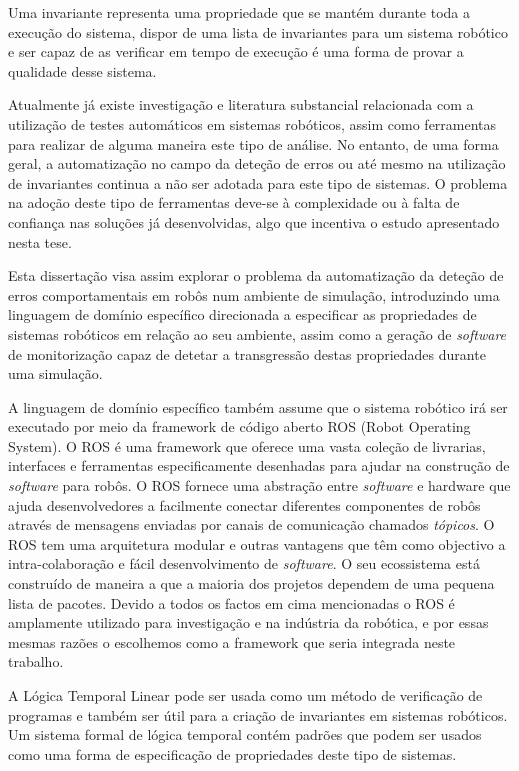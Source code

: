 Uma invariante representa uma propriedade que se mantém durante toda a execução do sistema, dispor de uma lista de invariantes para um sistema robótico e ser capaz de as verificar em tempo de execução é uma forma de provar a qualidade desse sistema.

Atualmente já existe investigação e literatura substancial relacionada com a utilização de testes automáticos em sistemas robóticos, assim como ferramentas para realizar de alguma maneira este tipo de análise. No entanto, de uma forma geral, a automatização no campo da deteção de erros ou até mesmo na utilização de invariantes continua a não ser adotada para este tipo de sistemas. O problema na adoção deste tipo de ferramentas deve-se à complexidade ou à falta de confiança nas soluções já desenvolvidas, algo que incentiva o estudo apresentado nesta tese.

Esta dissertação visa assim explorar o problema da automatização da deteção de erros comportamentais em robôs num ambiente de simulação, introduzindo uma linguagem de domínio específico direcionada a especificar as propriedades de sistemas robóticos em relação ao seu ambiente, assim como a geração de \textit{software} de monitorização capaz de detetar a transgressão destas propriedades durante uma simulação.

A linguagem de domínio específico também assume que o sistema robótico irá ser executado por meio da framework de código aberto ROS (Robot Operating System). O ROS é uma framework que oferece uma vasta coleção de livrarias, interfaces e ferramentas especificamente desenhadas para ajudar na construção de \textit{software} para robôs. O ROS fornece uma abstração entre \textit{software} e hardware que ajuda desenvolvedores a facilmente conectar diferentes componentes de robôs através de mensagens enviadas por canais de comunicação chamados \textit{tópicos}. O ROS tem uma arquitetura modular e outras vantagens que têm como objectivo a intra-colaboração e fácil desenvolvimento de \textit{software}. O seu ecossistema está construído de maneira a que a maioria dos projetos dependem de uma pequena lista de pacotes. Devido a todos os factos em cima mencionadas o ROS é amplamente utilizado para investigação e na indústria da robótica, e por essas mesmas razões o escolhemos como a framework que seria integrada neste trabalho.

A Lógica Temporal Linear pode ser usada como um método de verificação de programas e também ser útil para a criação de invariantes em sistemas robóticos. Um sistema formal de lógica temporal contém padrões que podem ser usados como uma forma de especificação de propriedades deste tipo de sistemas.

